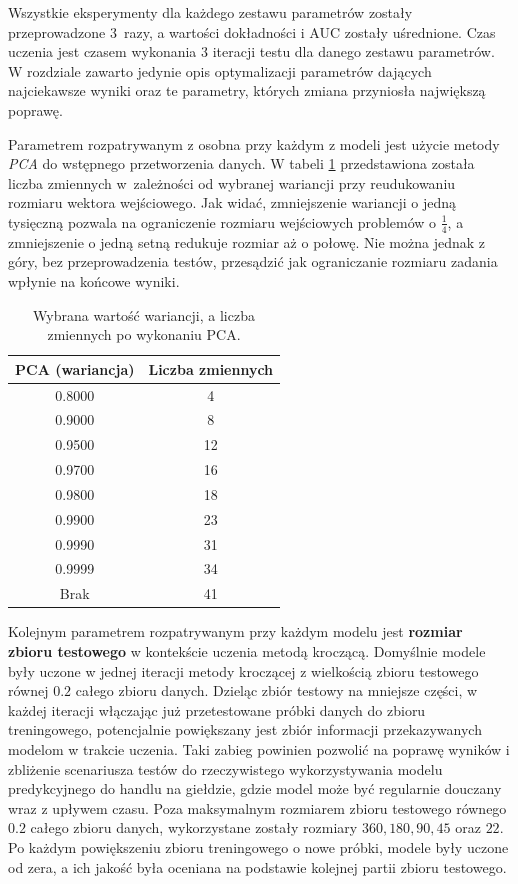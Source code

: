 \documentclass[a4paper, twoside, 11pt, openright]{article}
\begin{document}
Wszystkie eksperymenty dla każdego zestawu parametrów zostały przeprowadzone 3~razy, a wartości dokładności i AUC zostały uśrednione. Czas uczenia jest czasem wykonania 3 iteracji testu dla danego zestawu parametrów. W rozdziale zawarto jedynie opis optymalizacji parametrów dających najciekawsze wyniki oraz te parametry, których zmiana przyniosła największą poprawę.

\bigskip

Parametrem rozpatrywanym z osobna przy każdym z modeli jest użycie metody \textit{PCA} do wstępnego przetworzenia danych. W tabeli \ref{tab:pca_component_number} przedstawiona została liczba zmiennych w~zależności od wybranej wariancji przy reudukowaniu rozmiaru wektora wejściowego. Jak widać, zmniejszenie wariancji o jedną tysięczną pozwala na ograniczenie rozmiaru wejściowych problemów o $\frac{1}{4}$, a zmniejszenie o jedną setną redukuje rozmiar aż o połowę. Nie można jednak z góry, bez przeprowadzenia testów, przesądzić jak ograniczanie rozmiaru zadania wpłynie na końcowe wyniki. 


\begin{table}[H]
    \centering
    \begin{tabular}{|c|c|}
    \hline
        \textbf{PCA (wariancja)} & \textbf{Liczba zmiennych} \\ \hline
        0.8000 & 4 \\ \hline 
        0.9000 & 8 \\ \hline 
        0.9500 & 12 \\ \hline 
        0.9700 & 16 \\ \hline 
        0.9800 & 18 \\ \hline 
        0.9900 & 23 \\ \hline
        0.9990 & 31 \\ \hline 
        0.9999 & 34 \\ \hline 
        Brak & 41 \\ \hline 
    \end{tabular}
    \caption{Wybrana wartość wariancji, a liczba zmiennych po wykonaniu PCA.}
    \label{tab:pca_component_number}
\end{table}

\bigskip

Kolejnym parametrem rozpatrywanym przy każdym modelu jest \textbf{rozmiar zbioru testowego} w kontekście uczenia metodą kroczącą. Domyślnie modele były uczone w jednej iteracji metody kroczącej z wielkością zbioru testowego równej $0.2$ całego zbioru danych. Dzieląc zbiór testowy na mniejsze części, w każdej iteracji włączając już przetestowane próbki danych do zbioru treningowego, potencjalnie powiększany jest zbiór informacji przekazywanych modelom w trakcie uczenia. Taki zabieg  powinien pozwolić na poprawę wyników i zbliżenie scenariusza testów do rzeczywistego wykorzystywania modelu predykcyjnego do handlu na giełdzie, gdzie model może być regularnie douczany wraz z upływem czasu. Poza maksymalnym rozmiarem zbioru testowego równego $0.2$ całego zbioru danych, wykorzystane zostały rozmiary $360, 180, 90, 45$ oraz $22$. Po każdym powiększeniu zbioru treningowego o nowe próbki, modele były uczone od zera, a ich jakość była oceniana na podstawie kolejnej partii zbioru testowego.
\end{document}
